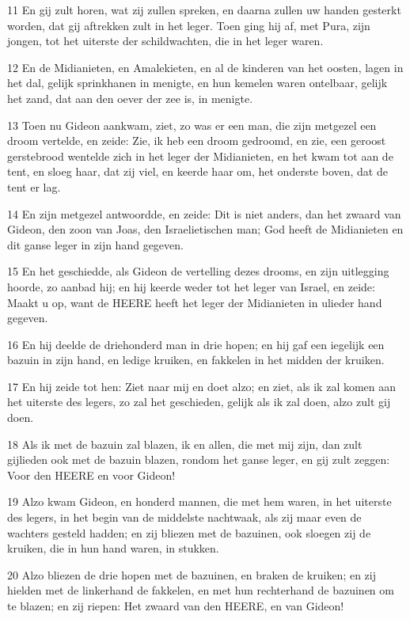 \par 11 En gij zult horen, wat zij zullen spreken, en daarna zullen uw handen gesterkt worden, dat gij aftrekken zult in het leger. Toen ging hij af, met Pura, zijn jongen, tot het uiterste der schildwachten, die in het leger waren.
\par 12 En de Midianieten, en Amalekieten, en al de kinderen van het oosten, lagen in het dal, gelijk sprinkhanen in menigte, en hun kemelen waren ontelbaar, gelijk het zand, dat aan den oever der zee is, in menigte.
\par 13 Toen nu Gideon aankwam, ziet, zo was er een man, die zijn metgezel een droom vertelde, en zeide: Zie, ik heb een droom gedroomd, en zie, een geroost gerstebrood wentelde zich in het leger der Midianieten, en het kwam tot aan de tent, en sloeg haar, dat zij viel, en keerde haar om, het onderste boven, dat de tent er lag.
\par 14 En zijn metgezel antwoordde, en zeide: Dit is niet anders, dan het zwaard van Gideon, den zoon van Joas, den Israelietischen man; God heeft de Midianieten en dit ganse leger in zijn hand gegeven.
\par 15 En het geschiedde, als Gideon de vertelling dezes drooms, en zijn uitlegging hoorde, zo aanbad hij; en hij keerde weder tot het leger van Israel, en zeide: Maakt u op, want de HEERE heeft het leger der Midianieten in ulieder hand gegeven.
\par 16 En hij deelde de driehonderd man in drie hopen; en hij gaf een iegelijk een bazuin in zijn hand, en ledige kruiken, en fakkelen in het midden der kruiken.
\par 17 En hij zeide tot hen: Ziet naar mij en doet alzo; en ziet, als ik zal komen aan het uiterste des legers, zo zal het geschieden, gelijk als ik zal doen, alzo zult gij doen.
\par 18 Als ik met de bazuin zal blazen, ik en allen, die met mij zijn, dan zult gijlieden ook met de bazuin blazen, rondom het ganse leger, en gij zult zeggen: Voor den HEERE en voor Gideon!
\par 19 Alzo kwam Gideon, en honderd mannen, die met hem waren, in het uiterste des legers, in het begin van de middelste nachtwaak, als zij maar even de wachters gesteld hadden; en zij bliezen met de bazuinen, ook sloegen zij de kruiken, die in hun hand waren, in stukken.
\par 20 Alzo bliezen de drie hopen met de bazuinen, en braken de kruiken; en zij hielden met de linkerhand de fakkelen, en met hun rechterhand de bazuinen om te blazen; en zij riepen: Het zwaard van den HEERE, en van Gideon!
